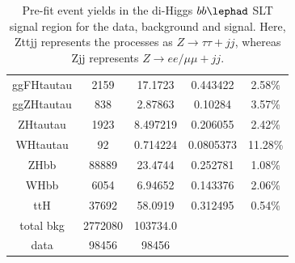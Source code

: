 \begin{table}
\begin{tabular}{|c|c|c|c|c|}
	ggFHtautau  &	2159        & 17.1723   & 0.443422   & 2.58\% \\
	ggZHtautau  &	838          & 2.87863   & 0.10284     & 3.57\% \\
	ZHtautau      &	1923        & 8.497219 & 0.206055   & 2.42\% \\
	WHtautau     &	92            & 0.714224 & 0.0805373 & 11.28\% \\
	ZHbb            &	88889      & 23.4744   & 0.252781   & 1.08\% \\
	WHbb           &	6054        & 6.94652   & 0.143376   & 2.06\% \\
	ttH                &	37692      & 58.0919   & 0.312495   & 0.54\% \\
	\hline
	
 	\hline
	total bkg  & 2772080 & 103734.0 & &\\
	data         & 98456     & 98456	& &\\
 	\hline
 	\hline
	  
      \end{tabular}
      \caption{Pre-fit event yields in the di-Higgs $bb\lephad$ SLT signal region for the data, background and signal. Here, Zttjj represents the processes as $Z\rightarrow\tau\tau + jj$,
      whereas Zjj represents  $Z\rightarrow ee/\mu\mu + jj$.}
      \label{tab:LepHadSLTYields}
\end{table}
  

